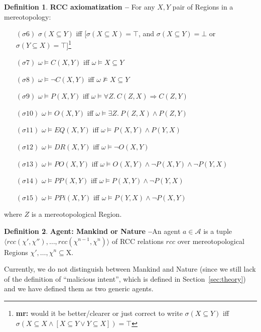 \documentclass{article}
\newcommand{\fixnote}[2]{\textbf{\color{red}{FIX}}\footnote{{\bf #1:} #2}}
\theoremstyle{definition}
\newtheorem{definition}{Definition}[section]
\theoremstyle{corollary}
\theoremstyle{lemma}
\theoremstyle{theorem}
\theoremstyle{theorem}
\newcommand{\world}{\omega}
\newcommand{\interpretation}{\sigma}
\newcommand{\region}{\chi}
\newcommand{\Region}{\mathrm{X}}
\newcommand{\agentuniverse}{\mathcal{A}}
\newcommand{\agent}{a}
\newcommand{\rcc}{rcc}
\newcommand{\connects}[2]{C(#1,#2)}
\newcommand{\disconnected}[2]{\neg C(#1,#2)}
\newcommand{\partof}[2]{P(#1,#2)}
\newcommand{\overlaps}[2]{O(#1,#2)}
\newcommand{\eq}[2]{EQ(#1,#2)}
\newcommand{\pp}[2]{PP(#1,#2)}
\newcommand{\po}[2]{PO(#1,#2)}
\newcommand{\ppi}[2]{PPi(#1,#2)}
\newcommand{\dr}[2]{DR(#1,#2)}
\begin{document}
\begin{definition}{\bf RCC axiomatization --}
	For any $X,Y$ pair of Regions in a mereotopology:
	\begin{itemize}[noitemsep]
	\item[$(\interpretation6)$] $\interpretation(X\subseteq Y)$ iff [$\interpretation(X\subseteq X)=\top$, and $\interpretation(X\subseteq Y)=\bot$ or $\interpretation(Y\subseteq X)=\top$]\fixnote{mr}{would it be better/clearer or just correct to write $\sigma(X\subseteq Y)$ iff $\sigma(X\subseteq X\wedge [X\subseteq Y \vee Y\subseteq X])=\top$}
	\item[$(\interpretation7)$] $\world\models\connects{X}{Y}$ iff $\world\models X\subseteq Y$ 
	\item[$(\interpretation8)$] $\world\models\disconnected{X}{Y}$ iff  $\world\not\models X\subseteq Y$
	\item[$(\interpretation9)$] $\world\models\partof{X}{Y}$ iff $\world\models\forall Z.~\connects{Z}{X}\Rightarrow\connects{Z}{Y}$
	\item[$(\interpretation10)$] $\world\models\overlaps{X}{Y}$ iff $\world\models\exists Z.~\partof{Z}{X}\wedge\partof{Z}{Y}$
	\item[$(\interpretation11)$] $\world\models\eq{X}{Y}$ iff $\world\models\partof{X}{Y}\wedge\partof{Y}{X}$
	\item[$(\interpretation12)$] $\world\models\dr{X}{Y}$ iff $\world\models\neg\overlaps{X}{Y}$
	\item[$(\interpretation13)$] $\world\models\po{X}{Y}$ iff $\world\models\overlaps{X}{Y}\wedge\neg\partof{X}{Y}\wedge\neg\partof{Y}{X}$
	\item[$(\interpretation14)$] $\world\models\pp{X}{Y}$ iff $\world\models\partof{X}{Y}\wedge\neg\partof{Y}{X}$
	\item[$(\interpretation15)$] $\world\models\ppi{X}{Y}$ iff $\world\models\partof{Y}{X}\wedge\neg\partof{X}{Y}$
\end{itemize}
where $Z$ is a mereotopological Region.
\end{definition}

\begin{definition}{\bf Agent: Mankind or Nature --}\label{def:agent}
	An agent $\agent\in\agentuniverse$ is a tuple
	$\langle\rcc(\region',\region''),\ldots,\rcc(\region^{n-1},\region^n)\rangle$
	of RCC relations $\rcc$ over mereotopological Regions
	${\region',\ldots,\region^n}\subseteq\Region$. 
\end{definition}

Currently, we do not distinguish between Mankind and Nature (since we still
lack of the definition of ``malicious intent'', which is defined in
Section~\ref{sec:theory}) and we have defined them as two generic
agents.
\end{document}
